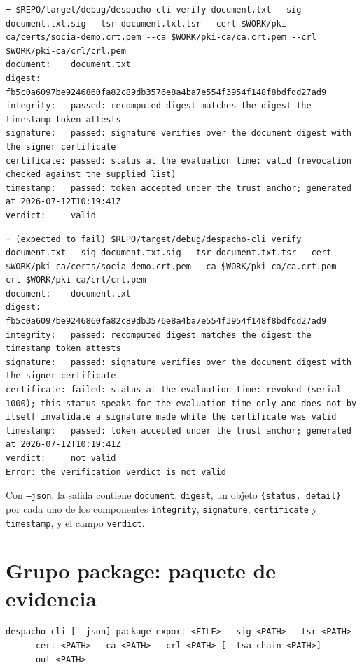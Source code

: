 \begin{lstlisting}[numbers=none]
+ $REPO/target/debug/despacho-cli verify document.txt --sig document.txt.sig --tsr document.txt.tsr --cert $WORK/pki-ca/certs/socia-demo.crt.pem --ca $WORK/pki-ca/ca.crt.pem --crl $WORK/pki-ca/crl/crl.pem
document:    document.txt
digest:      fb5c0a6097be9246860fa82c89db3576e8a4ba7e554f3954f148f8bdfdd27ad9
integrity:   passed: recomputed digest matches the digest the timestamp token attests
signature:   passed: signature verifies over the document digest with the signer certificate
certificate: passed: status at the evaluation time: valid (revocation checked against the supplied list)
timestamp:   passed: token accepted under the trust anchor; generated at 2026-07-12T10:19:41Z
verdict:     valid
\end{lstlisting}

\begin{lstlisting}[numbers=none]
+ (expected to fail) $REPO/target/debug/despacho-cli verify document.txt --sig document.txt.sig --tsr document.txt.tsr --cert $WORK/pki-ca/certs/socia-demo.crt.pem --ca $WORK/pki-ca/ca.crt.pem --crl $WORK/pki-ca/crl/crl.pem
document:    document.txt
digest:      fb5c0a6097be9246860fa82c89db3576e8a4ba7e554f3954f148f8bdfdd27ad9
integrity:   passed: recomputed digest matches the digest the timestamp token attests
signature:   passed: signature verifies over the document digest with the signer certificate
certificate: failed: status at the evaluation time: revoked (serial 1000); this status speaks for the evaluation time only and does not by itself invalidate a signature made while the certificate was valid
timestamp:   passed: token accepted under the trust anchor; generated at 2026-07-12T10:19:41Z
verdict:     not valid
Error: the verification verdict is not valid
\end{lstlisting}

Con \texttt{--json}, la salida contiene \texttt{document}, \texttt{digest}, un objeto \texttt{\{status, detail\}} por cada uno de los componentes \texttt{integrity}, \texttt{signature}, \texttt{certificate} y \texttt{timestamp}, y el campo \texttt{verdict}.

\section{Grupo package: paquete de evidencia}\label{sec:cli-package}

\begin{lstlisting}[numbers=none]
despacho-cli [--json] package export <FILE> --sig <PATH> --tsr <PATH>
    --cert <PATH> --ca <PATH> --crl <PATH> [--tsa-chain <PATH>]
    --out <PATH>
\end{lstlisting}

